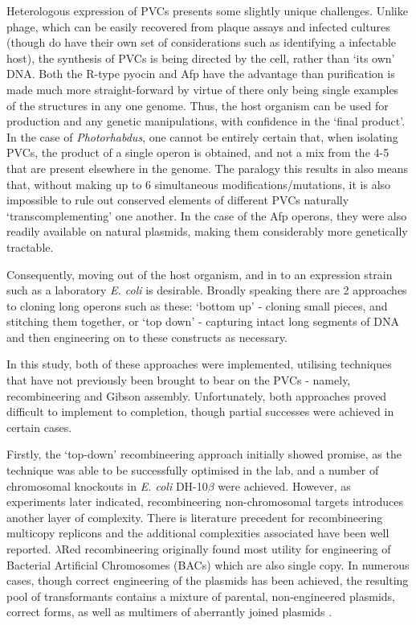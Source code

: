 Heterologous expression of PVCs presents some slightly unique challenges. Unlike phage, which can be easily recovered from plaque assays and infected cultures (though do have their own set of considerations such as identifying a infectable host), the synthesis of PVCs is being directed by the cell, rather than `its own' DNA. Both the R-type pyocin and Afp have the advantage than purification is made much more straight-forward by virtue of there only being single examples of the structures in any one genome. Thus, the host organism can be used for production and any genetic manipulations, with confidence in the `final product'. In the case of \emph{Photorhabdus}, one cannot be entirely certain that, when isolating PVCs, the product of a single operon is obtained, and not a mix from the 4-5 that are present elsewhere in the genome. The paralogy this results in also means that, without making up to 6 simultaneous modifications/mutations, it is also impossible to rule out conserved elements of different PVCs naturally `transcomplementing' one another. In the case of the Afp operons, they were also readily available on natural plasmids, making them considerably more genetically tractable.

Consequently, moving out of the host organism, and in to an expression strain such as a laboratory \emph{E. coli} is desirable. Broadly speaking there are 2 approaches to cloning long operons such as these: `bottom up' - cloning small pieces, and stitching them together, or `top down' - capturing intact long segments of DNA and then engineering on to these constructs as necessary.

In this study, both of these approaches were implemented, utilising techniques that have not previously been brought to bear on the PVCs - namely, recombineering and Gibson assembly. Unfortunately, both approaches proved difficult to implement to completion, though partial successes were achieved in certain cases.

Firstly, the `top-down' recombineering approach initially showed promise, as the technique was able to be successfully optimised in the lab, and a number of chromosomal knockouts in \emph{E. coli} DH-10$\beta$ were achieved. However, as experiments later indicated, recombineering non-chromosomal targets introduces another layer of complexity. There is literature precedent for recombineering multicopy replicons and the additional complexities associated have been well reported. $\lambda$Red recombineering originally found most utility for engineering of Bacterial Artificial Chromosomes (BACs) which are also single copy. In numerous cases, though correct engineering of the plasmids has been achieved, the resulting pool of transformants contains a mixture of parental, non-engineered plasmids, correct forms, as well as multimers of aberrantly joined plasmids \citep{Thomason2007, Lee2001a, Yosef2004, Vetcher2005}.

